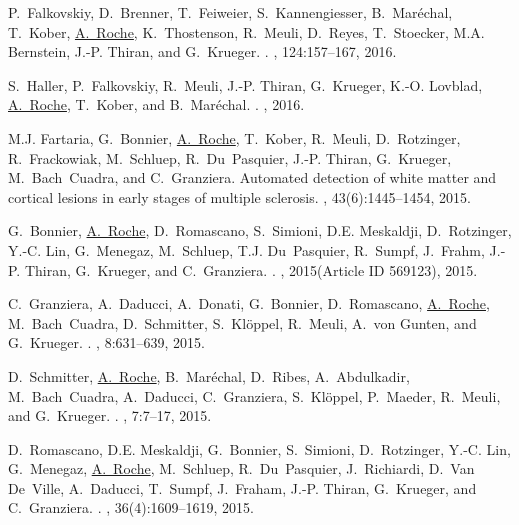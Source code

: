 \begin{thebibliography}{100}
P.~Falkovskiy, D.~Brenner, T.~Feiweier, S.~Kannengiesser, B.~Mar\'echal,
  T.~Kober, \underline{A.~Roche}, K.~Thostenson, R.~Meuli, D.~Reyes, T.~Stoecker, M.A.
  Bernstein, J.-P. Thiran, and G.~Krueger.
.
, 124:157--167, 2016.

S.~Haller, P.~Falkovskiy, R.~Meuli, J.-P. Thiran, G.~Krueger, K.-O. Lovblad,
  \underline{A.~Roche}, T.~Kober, and B.~Mar\'echal.
.
, 2016.

M.J. Fartaria, G.~Bonnier, \underline{A.~Roche}, T.~Kober, R.~Meuli, D.~Rotzinger,
  R.~Frackowiak, M.~Schluep, R.~Du~Pasquier, J.-P. Thiran, G.~Krueger,
  M.~Bach~Cuadra, and C.~Granziera.
\newblock Automated detection of white matter and cortical lesions in early
  stages of multiple sclerosis.
, 43(6):1445--1454, 2015.

G.~Bonnier, \underline{A.~Roche}, D.~Romascano, S.~Simioni, D.E. Meskaldji, D.~Rotzinger,
  Y.-C. Lin, G.~Menegaz, M.~Schluep, T.J. Du~Pasquier, R.~Sumpf, J.~Frahm,
  J.-P. Thiran, G.~Krueger, and C.~Granziera.
.
, 2015(Article ID 569123), 2015.

C.~Granziera, A.~Daducci, A.~Donati, G.~Bonnier, D.~Romascano, \underline{A.~Roche},
  M.~Bach~Cuadra, D.~Schmitter, S.~Kl{\"o}ppel, R.~Meuli, A.~von Gunten, and
  G.~Krueger.
.
, 8:631--639, 2015.

D.~Schmitter, \underline{A.~Roche}, B.~Mar\'echal, D.~Ribes, A.~Abdulkadir, M.~Bach~Cuadra,
  A.~Daducci, C.~Granziera, S.~Kl\"oppel, P.~Maeder, R.~Meuli, and G.~Krueger.
.
, 7:7--17, 2015.

D.~Romascano, D.E. Meskaldji, G.~Bonnier, S.~Simioni, D.~Rotzinger, Y.-C. Lin,
  G.~Menegaz, \underline{A.~Roche}, M.~Schluep, R.~Du~Pasquier, J.~Richiardi, D.~Van
  De~Ville, A.~Daducci, T.~Sumpf, J.~Fraham, J.-P. Thiran, G.~Krueger, and
  C.~Granziera.
.
, 36(4):1609--1619, 2015.


\end{thebibliography}
